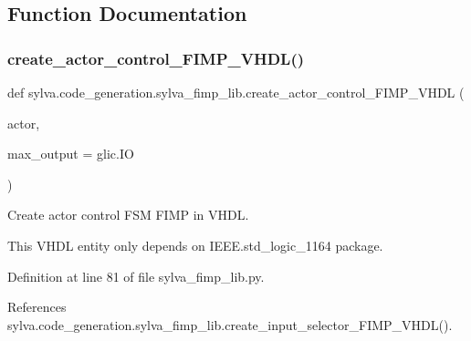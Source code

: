 \subsection{Function Documentation}
\mbox{\label{namespacesylva_1_1code__generation_1_1sylva__fimp__lib_a04ee93f22621c39841f015d731dad847}} 
\subsubsection{\texorpdfstring{create\+\_\+actor\+\_\+control\+\_\+\+F\+I\+M\+P\+\_\+\+V\+H\+D\+L()}{create\_actor\_control\_FIMP\_VHDL()}}
{\footnotesize\ttfamily def sylva.\+code\+\_\+generation.\+sylva\+\_\+fimp\+\_\+lib.\+create\+\_\+actor\+\_\+control\+\_\+\+F\+I\+M\+P\+\_\+\+V\+H\+DL (\begin{DoxyParamCaption}\item[{}]{actor,  }\item[{}]{max\+\_\+output = {\ttfamily glic.IO} }\end{DoxyParamCaption})}

\begin{DoxyVerb}Create actor control FSM FIMP in VHDL.

This VHDL entity only depends on IEEE.std_logic_1164 package.
\end{DoxyVerb}
 

Definition at line 81 of file sylva\+\_\+fimp\+\_\+lib.\+py.



References sylva.\+code\+\_\+generation.\+sylva\+\_\+fimp\+\_\+lib.\+create\+\_\+input\+\_\+selector\+\_\+\+F\+I\+M\+P\+\_\+\+V\+H\+D\+L().


